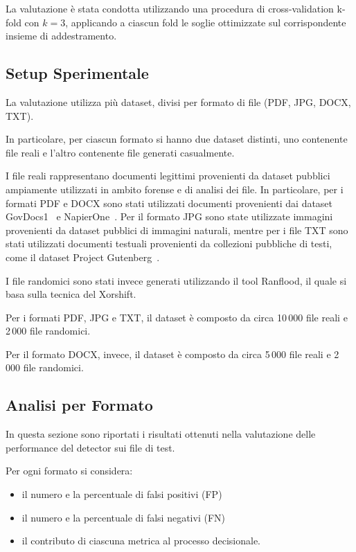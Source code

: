 \documentclass{report}
\begin{document}
\bigskip

La valutazione è stata condotta utilizzando una procedura di cross-validation
k-fold con $k = 3$, applicando a ciascun fold le soglie ottimizzate sul
corrispondente insieme di addestramento.


\subsection{Setup Sperimentale}

La valutazione utilizza più dataset, divisi per formato di file (PDF, JPG, DOCX, TXT).

In particolare, per ciascun formato si hanno due dataset distinti, uno contenente file reali e l'altro contenente file generati casualmente.

I file reali rappresentano documenti legittimi provenienti da dataset pubblici ampiamente utilizzati in ambito forense e di analisi dei file. In particolare, per i formati PDF e DOCX sono stati utilizzati documenti provenienti dai dataset GovDocs1~\cite{garfinkel2009govdocs} e NapierOne~\cite{davies2022napierone,napierone_dataset}.  
Per il formato JPG sono state utilizzate immagini provenienti da dataset pubblici di immagini naturali, mentre per i file TXT sono stati utilizzati documenti testuali provenienti da collezioni pubbliche di testi, come il dataset Project Gutenberg~\cite{bejan2020gutenberg}.

I file randomici sono stati invece generati utilizzando il tool Ranflood, il quale si basa sulla tecnica del Xorshift.

Per i formati PDF, JPG e TXT, il dataset è composto da circa 10\,000 file reali e
2\,000 file randomici.

Per il formato DOCX, invece, il dataset è composto da circa 5\,000 file reali e
2\,000 file randomici.


\subsection{Analisi per Formato}

In questa sezione sono riportati i risultati ottenuti nella valutazione delle performance del detector sui file di test.

Per ogni formato si considera:
\begin{itemize}
    \item il numero e la percentuale di falsi positivi (FP)
    \item il numero e la percentuale di falsi negativi (FN)
    \item il contributo di ciascuna metrica al processo decisionale.
\end{itemize}
\end{document}
